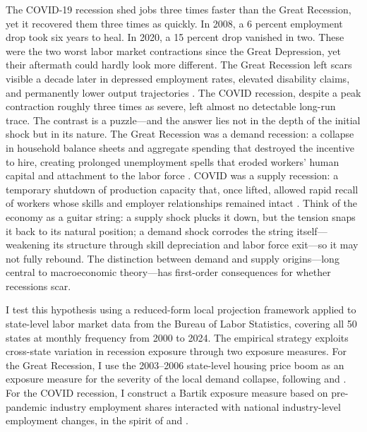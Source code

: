 \documentclass[12pt]{article}
\begin{document}
The COVID-19 recession shed jobs three times faster than the Great Recession, yet it recovered them three times as quickly. In 2008, a 6 percent employment drop took six years to heal. In 2020, a 15 percent drop vanished in two. These were the two worst labor market contractions since the Great Depression, yet their aftermath could hardly look more different. The Great Recession left scars visible a decade later in depressed employment rates, elevated disability claims, and permanently lower output trajectories \citep{yagan2019employment, fernald2017depression, summers2012there, ball2014long}. The COVID recession, despite a peak contraction roughly three times as severe, left almost no detectable long-run trace. The contrast is a puzzle---and the answer lies not in the depth of the initial shock but in its nature. The Great Recession was a demand recession: a collapse in household balance sheets and aggregate spending that destroyed the incentive to hire, creating prolonged unemployment spells that eroded workers' human capital and attachment to the labor force \citep{mian2014explains, blanchard1986hysteresis, pissarides1992loss, giroud2017firm}. COVID was a supply recession: a temporary shutdown of production capacity that, once lifted, allowed rapid recall of workers whose skills and employer relationships remained intact \citep{cajner2020us, gregory2020pandemic, barrero2021covid}. Think of the economy as a guitar string: a supply shock plucks it down, but the tension snaps it back to its natural position; a demand shock corrodes the string itself---weakening its structure through skill depreciation and labor force exit---so it may not fully rebound. The distinction between demand and supply origins---long central to macroeconomic theory---has first-order consequences for whether recessions scar.

I test this hypothesis using a reduced-form local projection framework applied to state-level labor market data from the Bureau of Labor Statistics, covering all 50 states at monthly frequency from 2000 to 2024. The empirical strategy exploits cross-state variation in recession exposure through two exposure measures. For the Great Recession, I use the 2003--2006 state-level housing price boom as an exposure measure for the severity of the local demand collapse, following \citet{mian2014explains} and \citet{charles2016masking}. For the COVID recession, I construct a Bartik exposure measure based on pre-pandemic industry employment shares interacted with national industry-level employment changes, in the spirit of \citet{bartik1991benefits} and \citet{goldsmith2020bartik}.
\end{document}
